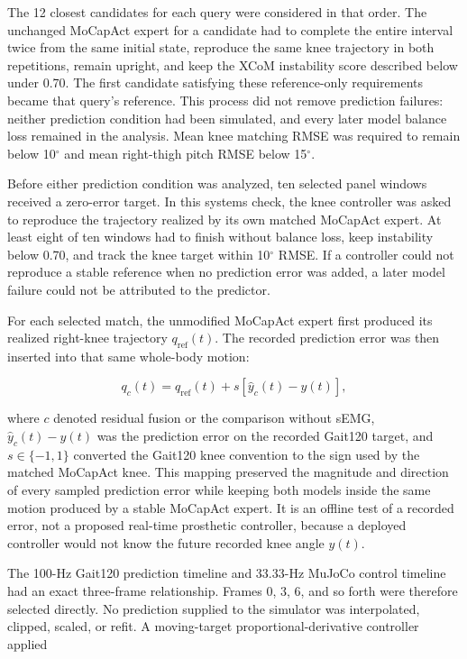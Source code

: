 \documentclass[referee,lineno,pdflatex,sn-vancouver-num]{sn-jnl}
\begin{document}
The 12 closest candidates for each query were considered in that order. The unchanged MoCapAct expert for a candidate had to complete the entire interval twice from the same initial state, reproduce the same knee trajectory in both repetitions, remain upright, and keep the XCoM instability score described below under 0.70. The first candidate satisfying these reference-only requirements became that query's reference. This process did not remove prediction failures: neither prediction condition had been simulated, and every later model balance loss remained in the analysis. Mean knee matching RMSE was required to remain below 10$^{\circ}$ and mean right-thigh pitch RMSE below 15$^{\circ}$.

Before either prediction condition was analyzed, ten selected panel windows received a zero-error target. In this systems check, the knee controller was asked to reproduce the trajectory realized by its own matched MoCapAct expert. At least eight of ten windows had to finish without balance loss, keep instability below 0.70, and track the knee target within 10$^{\circ}$ RMSE. If a controller could not reproduce a stable reference when no prediction error was added, a later model failure could not be attributed to the predictor.

For each selected match, the unmodified MoCapAct expert first produced its realized right-knee trajectory $q_{\mathrm{ref}}(t)$. The recorded prediction error was then inserted into that same whole-body motion:

\begin{equation}
q_c(t)=q_{\mathrm{ref}}(t)+s\left[\hat y_c(t)-y(t)\right],
\label{eq:mapping}
\end{equation}

where $c$ denoted residual fusion or the comparison without sEMG, $\hat y_c(t)-y(t)$ was the prediction error on the recorded Gait120 target, and $s\in\{-1,1\}$ converted the Gait120 knee convention to the sign used by the matched MoCapAct knee. This mapping preserved the magnitude and direction of every sampled prediction error while keeping both models inside the same motion produced by a stable MoCapAct expert. It is an offline test of a recorded error, not a proposed real-time prosthetic controller, because a deployed controller would not know the future recorded knee angle $y(t)$.

The 100-Hz Gait120 prediction timeline and 33.33-Hz MuJoCo control timeline had an exact three-frame relationship. Frames 0, 3, 6, and so forth were therefore selected directly. No prediction supplied to the simulator was interpolated, clipped, scaled, or refit. A moving-target proportional-derivative controller applied
\end{document}
